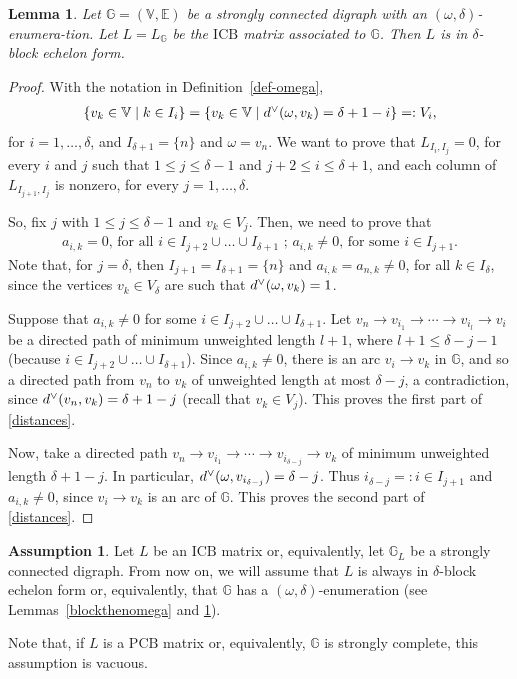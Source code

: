 \documentclass[10pt]{amsart}
\newcommand{\mbg}{\mbox{$\mathbb{G}$}}
\newcommand{\mbv}{\mbox{$\mathbb{V}$}}
\newcommand{\mbe}{\mbox{$\mathbb{E}$}}
\newcommand{\icb}{\mbox{$\mathrm{ICB}$}}
\newcommand{\pcb}{\mbox{$\mathrm{PCB}$}}
\newcommand{\ud}{\mbox{${\rm d}^\vee$}}
\newtheorem{lemma}[cdrthm]{Lemma}
\theoremstyle{definition}
\newtheorem{assumption}[cdrthm]{Assumption}
\theoremstyle{remark}
\begin{document}
\begin{lemma}\label{omegathenblock}
Let $\mbg=(\mbv,\mbe)$ be a strongly connected digraph with an
$(\omega,\delta)$-enumera-tion. Let $L=L_{\mathbb{G}}$ be the $\icb$
matrix associated to $\mbg$. Then $L$ is in $\delta$-block echelon
form.
\end{lemma}
\begin{proof}
With the notation in Definition~\ref{def-omega}, 
\begin{eqnarray*}
\{v_k\in \mbv\mid
k\in I_i\}=\{v_k\in \mbv\mid \ud(\omega,v_k)=\delta+1-i\}=:V_i, 
\end{eqnarray*}
for $i=1,\ldots ,\delta$, and $I_{\delta+1}=\{n\}$ and $\omega=v_n$.
We want to prove that $L_{I_{i},I_{j}}=0$, for every $i$ and $j$ such
that $1\leq j\leq \delta-1$ and $j+2\leq i\leq \delta+1$, and each
column of $L_{I_{j+1},I_j}$ is nonzero, for every $j=1,\ldots
,\delta$.

So, fix $j$ with $1\leq j\leq \delta-1$ and $v_k\in V_j$. Then, we
need to prove that
\begin{eqnarray}\label{distances}
a_{i,k}=0\mbox{, for all }i\in I_{j+2}\cup\ldots \cup
  I_{\delta+1}\mbox{ ; } a_{i,k}\neq 0\mbox{, for some }i\in I_{j+1}.
\end{eqnarray}
Note that, for $j=\delta$, then $I_{j+1}=I_{\delta+1}=\{n\}$ and
$a_{i,k}=a_{n,k}\neq 0$, for all $k\in I_\delta$, since the vertices
$v_k\in V_\delta$ are such that $\ud(\omega,v_k)=1$.

Suppose that $a_{i,k}\neq 0$ for some $i\in I_{j+2}\cup\ldots \cup
I_{\delta+1}$. Let $v_n\to v_{i_1}\to \cdots \to v_{i_l}\to v_i$ be a
directed path of minimum unweighted length $l+1$, where $l+1\leq
\delta-j-1$ (because $i\in I_{j+2}\cup\ldots \cup
I_{\delta+1}$). Since $a_{i,k}\neq 0$, there is an arc $v_i\to v_k$ in
$\mbg$, and so a directed path from $v_n$ to $v_k$ of unweighted
length at most $\delta-j$, a contradiction, since
$\ud(v_n,v_k)=\delta+1-j$ (recall that $v_k\in V_j$). This proves the
first part of \eqref{distances}.

Now, take a directed path $v_n\to v_{i_1}\to \cdots \to
v_{i_{\delta-j}}\to v_k$ of minimum unweighted length
$\delta+1-j$. In particular, $\ud(\omega
,v_{i_{\delta-j}})=\delta-j$. Thus $i_{\delta-j}=:i\in I_{j+1}$ and
$a_{i,k}\neq 0$, since $v_i\to v_k$ is an arc of $\mbg$. This proves the
second part of \eqref{distances}.
\end{proof}

\begin{assumption}\label{echelon-omega}
Let $L$ be an $\icb$ matrix or, equivalently, let $\mbg_L$ be a
strongly connected digraph. From now on, we will assume that $L$ is
always in $\delta$-block echelon form or, equivalently, that $\mbg$
has a $(\omega,\delta)$-enumeration (see Lemmas~\ref{blockthenomega}
and \ref{omegathenblock}).

Note that, if $L$ is a $\pcb$ matrix or, equivalently, $\mbg$ is
strongly complete, this assumption is vacuous.
\end{assumption}
\end{document}
